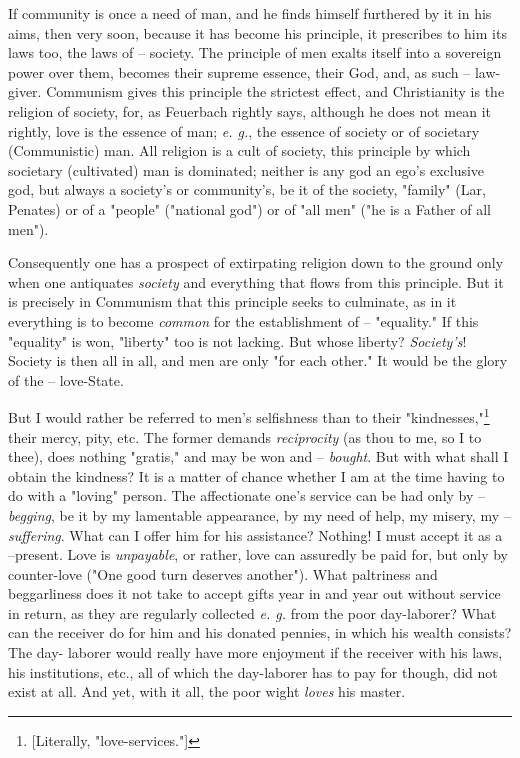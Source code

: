 If community is once a need of man, and he finds himself furthered by it in 
his aims, then very soon, because it has become his principle, it prescribes 
to him its laws too, the laws of -- society. The principle of men exalts 
itself into a sovereign power over them, becomes their supreme essence, their 
God, and, as such -- law-giver. Communism gives this principle the strictest 
effect, and Christianity is the religion of society, for, as Feuerbach rightly 
says, although he does not mean it rightly, love is the essence of man; 
\textit{e. g.}, the essence of society or of societary (Communistic) man. All 
religion is a cult of society, this principle by which societary (cultivated) 
man is dominated; neither is any god an ego's exclusive god, but always a 
society's or community's, be it of the society, "{}family"{} (Lar, Penates) or 
of a "{}people"{} ("{}national god"{}) or of "{}all men"{} ("{}he is a Father 
of all men"{}).

Consequently one has a prospect of extirpating religion down to the ground 
only when one antiquates \textit{society} and everything that flows from this 
principle. But it is precisely in Communism that this principle seeks to 
culminate, as in it everything is to become \textit{common} for the 
establishment of -- "{}equality."{} If this "{}equality"{} is won, 
"{}liberty"{} too is not lacking. But whose liberty? \textit{Society's}! 
Society is then all in all, and men are only "{}for each other."{} It would be 
the glory of the -- love-State.

But I would rather be referred to men's selfishness than to their 
"{}kindnesses,"{}\footnote{[Literally, "{}love-services."{}]} their mercy, 
pity, etc. The former demands \textit{reciprocity} (as thou to me, so I to 
thee), does nothing "{}gratis,"{} and may be won and -- \textit{bought}. But 
with what shall I obtain the kindness? It is a matter of chance whether I am 
at the time having to do with a "{}loving"{} person. The affectionate one's 
service can be had only by -- \textit{begging}, be it by my lamentable 
appearance, by my need of help, my misery, my -- \textit{suffering}. What can 
I offer him for his assistance? Nothing! I must accept it as a --present. Love 
is \textit{unpayable}, or rather, love can assuredly be paid for, but only by 
counter-love ("{}One good turn deserves another"{}). What paltriness and 
beggarliness does it not take to accept gifts year in and year out without 
service in return, as they are regularly collected \textit{e. g.} from the 
poor day-laborer? What can the receiver do for him and his donated pennies, in 
which his wealth consists? The day- laborer would really have more enjoyment 
if the receiver with his laws, his institutions, etc., all of which the 
day-laborer has to pay for though, did not exist at all. And yet, with it all, 
the poor wight \textit{loves} his master.

